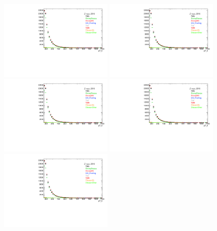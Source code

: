 \begin{figure}[p]
\centering
\includegraphics[width=0.48\textwidth,page=2]{figures/nonZjj_bkg_plots_VBFZ.pdf}
\includegraphics[width=0.48\textwidth,page=4]{figures/nonZjj_bkg_plots_VBFZ.pdf}
\includegraphics[width=0.48\textwidth,page=6]{figures/nonZjj_bkg_plots_VBFZ.pdf}
\includegraphics[width=0.48\textwidth,page=8]{figures/nonZjj_bkg_plots_VBFZ.pdf}
\includegraphics[width=0.48\textwidth,page=10]{figures/nonZjj_bkg_plots_VBFZ.pdf}

\end{figure}
